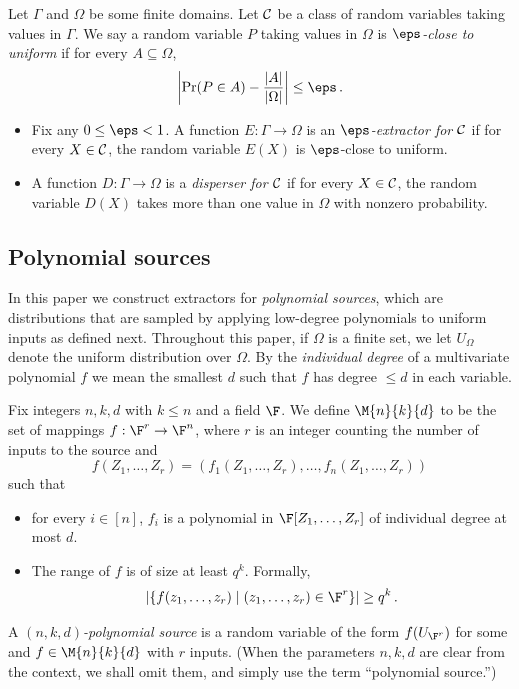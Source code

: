\begin{definition}
Let $\Gamma$ and $\Omega$ be some finite domains.
Let ${\cal C}$ be a class of random variables taking values in  $\Gamma$.
We say a random variable $P$ taking values in $\Omega$ is
\emph{$\eps$-close to uniform} if for every  $A\subseteq \Omega$,
%
%
\[\left|\Pr (P \in A) - \frac{|A|}{|\Omega|}\right| \leq \eps\,.\]
\begin{itemize}
%
%
%
%
\item Fix any $0\leq \eps <1$. A function $E:\Gamma \to\Omega$
is an \emph{$\eps$-extractor for ${\cal C}$}
if for every $X \in {\cal C}$,
the random variable %
$E(X)$ is $\eps$-close to %
uniform.
%
%
\item A function $D:\Gamma \to\Omega$ is
%
a \emph{disperser for ${\cal C}$} if for every $X \in {\cal C}$,
the random variable %
$D(X)$ takes more than %
one value in $\Omega$ with nonzero probability.
\end{itemize}
\end{definition}
\subsection{Polynomial sources}

%
%
%
In this paper we construct extractors for \emph{polynomial sources},
which are distributions that are sampled by applying low-degree
%
polynomials to uniform inputs as defined next.
%
%
%
Throughout this paper, if $\Omega$ is a finite set, we let
$U_\Omega$ denote the uniform distribution over $\Omega$.
%
%
By the \emph{individual degree} of a multivariate polynomial $f$ we
mean the smallest $d$ such that $f$ has degree $\le d$
in each variable.


\begin{definition}\label{dfn-polysource}
Fix integers $n,k,d$ with $k\leq n$ and a field $\F$.
We define $\M{n}{k}{d}$ to be the set of mappings $f:\F^r\to\F^n$,
where $r$ is an integer counting the number of inputs to the source and
\[f(Z_1,\ldots,Z_r)=(f_1(Z_1,\ldots,Z_r),\ldots,f_n(Z_1,\ldots,Z_r))\] such that
\begin{itemize}
\item for every $i\in [n]$, $f_i$ is a polynomial in $\F[Z_1,\ldots,Z_r]$
of individual degree at most $d$.
\item The range
%
%
%
%
%
%
%
of $f$ is of size at least $q^k$. Formally,
\[|\{f(z_1,\ldots,z_r)\mid (z_1,\ldots,z_r)\in \F^r\}| \geq q^k\,.\]
\end{itemize}
%
A \emph{$(n,k,d)$-polynomial source} is a random variable of the form
$f(U_{\F^r})$ for some and $f\in \M{n}{k}{d}$ with $r$ inputs.
(When the parameters $n,k,d$ are clear from
%
%
the context, we shall omit them, and simply use the term
``polynomial source.'')

\end{definition}


